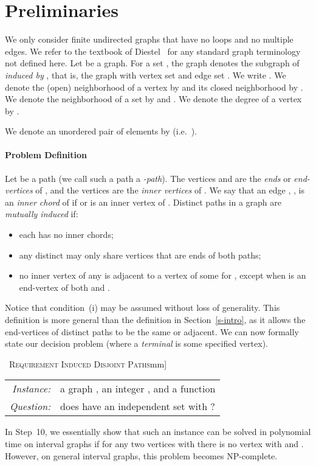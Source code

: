 \documentclass{llncs}
\newcommand{\ie}{i.e.~}
\newcommand{\problemRIDP}{\textsc{Requirement Induced Disjoint Paths}}
\begin{document}
\section{Preliminaries}\label{s-pre}
We only consider finite undirected graphs that have no loops and no multiple edges. 
We refer to the textbook of Diestel~\cite{Di05} for any standard graph terminology not defined here. Let  be a graph. 
For a set , the graph  denotes the subgraph of  {\it induced by} , that is, the graph with vertex set  and edge set .  We write . 
We denote the (open) neighborhood of a vertex  by  and its closed neighborhood by .
We denote the neighborhood of a set  by  and . 
We denote the degree of a vertex  by .

We denote an unordered pair of elements  by   (\ie ).

\paragraph{Problem Definition}
Let  be a path (we call such a path a {\em -path}).
The vertices  and   are the {\it ends} or {\it end-vertices} of , and the vertices  are the \emph{inner vertices} of .
We say that an edge , , is an \emph{inner chord} of  if  or  is an inner vertex of .
Distinct paths  in a graph   are {\it mutually induced} if:
\begin{itemize}
\item [(i)] each  has no inner chords;
\item [(ii)]  any distinct  may only share vertices that are ends of both paths;
\item [(iii)]  no inner vertex  of any  is adjacent to a vertex  of some  for , except when  is an end-vertex of both  and .
\end{itemize}
Notice that condition~(i) may be assumed without loss of generality. This definition is more general than the definition in Section~\ref{s-intro}, as it allows the end-vertices of distinct paths to be the same or adjacent. 
We can now formally state our decision problem (where a {\em terminal} is some specified vertex).
\begin{center}
\begin{boxedminipage}{1\textwidth}
\ \problemRIDP{}\3mm]
\begin{tabular}{r l }
\textit{Instance:} & a graph , an integer , and a function \\
\textit{Question:} & does  have an independent set  with ?  \\
\end{tabular}
\end{boxedminipage}
\end{center}
In Step~10, we essentially show that such an instance can be solved in polynomial time on interval graphs if for any two vertices  with  there is no vertex  with  and . However, on general interval graphs, this problem becomes NP-complete.
\end{document}
